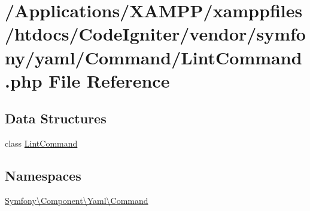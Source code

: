 \hypertarget{_lint_command_8php}{}\section{/\+Applications/\+X\+A\+M\+P\+P/xamppfiles/htdocs/\+Code\+Igniter/vendor/symfony/yaml/\+Command/\+Lint\+Command.php File Reference}
\label{_lint_command_8php}
\subsection*{Data Structures}
\begin{DoxyCompactItemize}
\item 
class \mbox{\hyperlink{class_symfony_1_1_component_1_1_yaml_1_1_command_1_1_lint_command}{Lint\+Command}}
\end{DoxyCompactItemize}
\subsection*{Namespaces}
\begin{DoxyCompactItemize}
\item 
 \mbox{\hyperlink{namespace_symfony_1_1_component_1_1_yaml_1_1_command}{Symfony\textbackslash{}\+Component\textbackslash{}\+Yaml\textbackslash{}\+Command}}
\end{DoxyCompactItemize}
